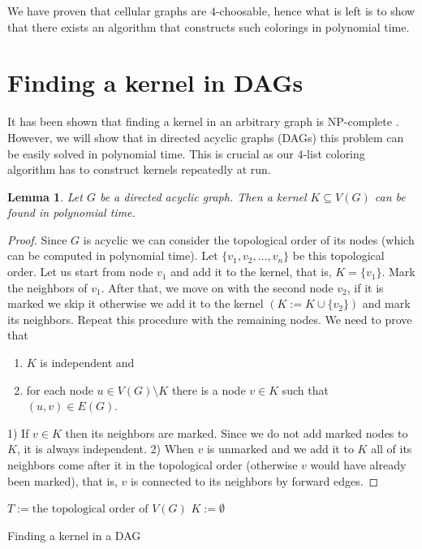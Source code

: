 \documentclass[letterpaper, 10 pt, conference]{ieeeconf}  %
\newtheorem{lem}{Lemma}
\begin{document}
We have proven that cellular graphs are $4$-choosable, hence what is left is to show that there exists an algorithm that constructs such colorings in polynomial time.
\section{Finding a kernel in DAGs}\label{sec:dag}

It has been shown that finding a kernel in an arbitrary graph is $\mathrm{NP}$-complete \cite{chvatal}. However, we will show that in directed acyclic graphs (DAGs) this problem can be easily solved in polynomial time. This is crucial as our $4$-list coloring algorithm has to construct kernels repeatedly at run.

\begin{lem}\label{lem:kernel-lemma} Let $G$ be a directed acyclic graph. Then a kernel $K \subseteq V(G)$ can be found in polynomial time.
\end{lem}
\begin{proof} Since $G$ is acyclic we can consider the topological order of its nodes (which can be computed in polynomial time). Let $\lbrace v_1, v_2, \ldots, v_n \rbrace$ be this topological order. Let us start from node $v_1$ and add it to the kernel, that is, $K = \lbrace v_1 \rbrace$. Mark the neighbors of $v_1$. After that, we move on with the second node $v_2$, if it is marked we skip it otherwise we add it to the kernel $(K := K \cup \lbrace v_2 \rbrace)$ and mark its neighbors. Repeat this procedure with the remaining nodes. We need to prove that
\begin{enumerate}
\item $K$ is independent and
\item for each node $u \in V(G) \setminus K$ there is a node $v \in K$ such that $(u,v) \in E(G)$.
\end{enumerate}
1) If $v \in K$ then its neighbors are marked. Since we do not add marked nodes to $K$, it is always independent.
2) When $v$ is unmarked and we add it to $K$ all of its neighbors come after it in the topological order (otherwise $v$ would have already been marked), that is, $v$ is connected to its neighbors by forward edges.
\end{proof}
\begin{algorithm}\label{alg:find-kernel-in-dags}
 $T := \text{the topological order of $V(G)$}$\;
 $K := \emptyset$\;
 \caption{Finding a kernel in a DAG}
\end{algorithm}
\end{document}
